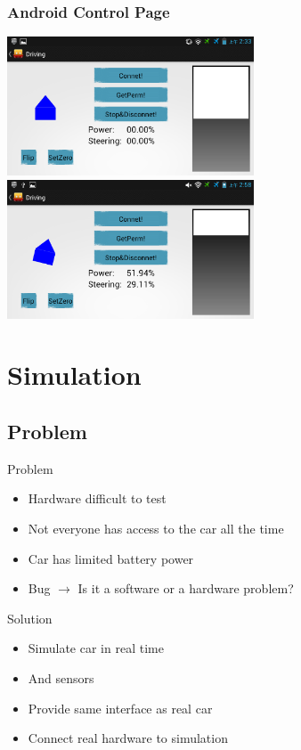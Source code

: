 \documentclass[pdf]{beamer}
\begin{document}
\begin{frame}
\frametitle{Android Control Page}
  \begin{center}
   \includegraphics[width = 0.55\textwidth]{pics/android_control.png}\\  
   \includegraphics[width = 0.55\textwidth]{pics/android_controlling.png}     
  \end{center}
\end{frame}

\section{Simulation}
\subsection{Problem}
\begin{frame}
\begin{alertblock}{Problem}
\begin{itemize}
  \item Hardware difficult to test
  \item Not everyone has access to the car all the time
  \item Car has limited battery power
  \item Bug $\rightarrow$ Is it a software or a hardware problem?
\end{itemize}
\end{alertblock}
\begin{exampleblock}{Solution}
\begin{itemize}
  \item Simulate car in real time
  \item And sensors
  \item Provide same interface as real car
  \item Connect real hardware to simulation
\end{itemize}
\end{exampleblock}
\end{frame}
\end{document}
